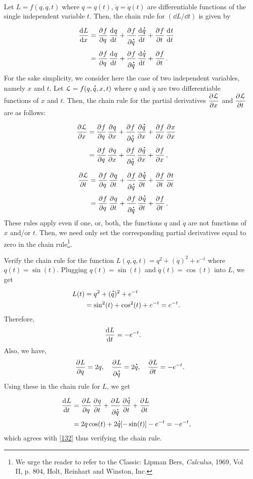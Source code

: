 \\ Let 
$L=f(q,\dot{q},t)$ where $q=q(t)$, $\dot{q}=\dot{q}(t)$ 
are  differentiable functions of the single independent 
variable $t$. Then, the chain rule for $(\dd L/\dd t)$ is 
given by
\begin{align}\label{128}
\dod{L}{x}
&=\dpd{f}{q}\dod{q}{t}+\dpd{f}{\dot{q}}\dod{\dot{q}}{t}
+\dpd{f}{t}\dod{t}{t}\notag\\
&=\dpd{f}{q}\dod{q}{t}+\dpd{f}{\dot{q}}\dod{\dot{q}}{t}
+\dpd{f}{t}.
\end{align}
 For the sake 
simplicity, we consider here the case of two independent 
variables, namely $x$ and $t$. Let 
$\EuScript{L}=f(q,\dot{q},x,t)$ where  $q$ and $\dot{q}$ 
are 
two differentiable functions of $x$ and $t$. Then, the 
chain 
rule for the partial derivatives $\dpd{\EuScript{L}}{x}$ 
and $\dpd{\EuScript{L}}{t}$ are as follows:
\begin{align}\label{129}
\dpd{\EuScript{L}}{x}
&=\dpd{f}{q}\dpd{q}{x}+\dpd{f}{\dot{q}}\dpd{\dot{q}}{x}
+\dpd{f}{x}\dpd{x}{x}\notag\\ 
&=\dpd{f}{q}\dpd{q}{x}
+\dpd{f}{\dot{q}}\dpd{\dot{q}}{x} +\dpd{f}{x},
\end{align}
\begin{align}
\dpd{\EuScript{L}}{t}&=\dpd{f}{q}\dpd{q}{t}+\dpd{f}{
\dot {q}}
\dpd{\dot{q}}{t} +\dpd{f}{t}\dpd{t}{t} \notag\\
&=\dpd{f}{q}\dpd{q}{t}+\dpd{f}{\dot{q}} 
\dpd{ \dot{q}}{t} +\dpd{f}{t},\label{130}
\end{align}
These rules apply even if one, or, both, the functions 
$q$ and $\dot{q}$ are not functions of $x$ and/or $t$. 
Then, we need only set the corresponding partial 
derivatives equal to zero in the chain rule\footnote{We 
urge the reader to refer to the Classic: Lipman Bers, 
\textsl{Calculus}, 1969, Vol II, p. 804, Holt, Reinhart 
and Winston, Inc.}.

\exm Verify the chain rule for the function  
$L(q,\dot{q},t) =q^2+(\dot{q})^2+e^{-t}$  where  
$q(t)=\sin(t)$. \soln Plugging $q(t)=\sin(t)$ and 
$\dot{q}(t)=\cos(t)$ into $L$, we get
\begin{align}\label{131}
L(t)&=q^2+(\dot{q})^2+e^{-t}\notag\\&
=\sin^2(t)+\cos^2(t)+e^{-t}=e^{-t}.
\end{align}
Therefore,
\begin{align}\label{132}
\dod{L}{t}&=-e^{-t}.
\end{align}
Also, we have,
\begin{align*}\quad \dpd{L}{q} =2q , \quad
\dpd{L}{\dot{q}}=2\dot{q},\quad \dpd{L}{t}=-e^{-t}.
 \end{align*}
Using these in the chain rule for $L$, we get
\begin{align} \label{133}
 \dod{L}{t}&=\dpd{L}{q}\dpd{q}{t}
+\dpd{L}{\dot{q}}\dpd{\dot{q}}{t}+\dpd{L}{t}\notag\\
&=2q\cos(t)+2\dot{q}[-\sin(t)]-e^{-t}=-e^{-t},
\end{align}
which agrees with \eqref{132} thus verifying the chain rule.

